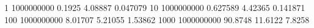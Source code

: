 1 1000000000 0.1925 4.08887 0.047079
10 1000000000 0.627589 4.42365 0.141871
100 1000000000 8.01707 5.21055 1.53862
1000 1000000000 90.8748 11.6122 7.8258
